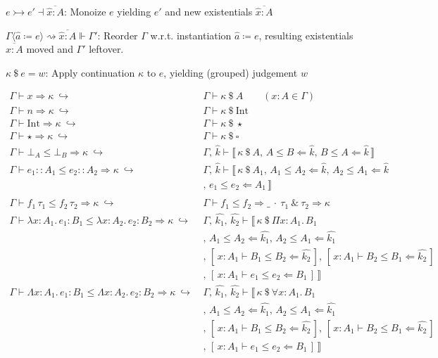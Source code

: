 \documentclass{article}
\newcommand{\inferapp}[4][\kappa]{#2 ~\cdot~#3~\&~#4 \Rightarrow #1}
\newcommand{\acheck}[3]{#1 \le #2 \Leftarrow #3}
\newcommand{\lcheck}[5][x]{[\,#1 : #2 \vdash \acheck{#3}{#4}{#5}\,]}
\newcommand{\ainfer}[3][\kappa]{#2 \le #3 \Rightarrow #1}
\newcommand{\sinfer}[2][\kappa]{#2 \Rightarrow #1}
\newcommand{\capp}[2][\kappa]{#1 ~\$~ #2}
\newcommand{\kvar}{\hat{k}}
\newcommand{\kvarn}[2][k]{\hat{#1_{#2}}}
\newcommand{\wlred}{~\hookrightarrow~ &}
\newcommand{\Int}{\mathrm{Int}}
\newcommand{\app}[2]{#1\,#2}
\newcommand{\alambda}[4][x]{\lambda #1 : #2.\, #3 : #4}
\newcommand{\abind}[4][x]{\Lambda #1 : #2.\, #3 : #4}
\newcommand{\aforall}[3][x]{\forall #1 : #2.\, #3}
\newcommand{\aPi}[3][x]{\Pi #1 : #2.\, #3}
\newcommand{\ngsep}{\\ & ,\,}
\newcommand{\wlgroup}[1]{\llbracket\, #1 \,\rrbracket}
\newcommand{\ex}[1][a]{\hat{#1}}
\newcommand{\exb}[2][a]{\hat{#1} : #2}
\newcommand{\monoize}[3]{#1 \rightarrowtail #2 \dashv \overline{#3}}
\newcommand{\reorder}[5]{#1\langle#2 \coloneqq #3 \rangle \rightsquigarrow \overline{#4} \Vdash #5}
\begin{document}
$\monoize{e}{e'}{\exb[x]{A}}$: Monoize $e$ yielding $e'$ and new existentials $\overline{\exb[x]{A}}$
\vspace{1em}

$\reorder{\Gamma}{\ex}{e}{\exb[x]{A}}{\Gamma'}$: Reorder $\Gamma$ w.r.t. instantiation $\ex \coloneqq e$,
resulting existentials $\overline{\exb[x]{A}}$ moved and $\Gamma'$ leftover.
\vspace{1em}

$\capp{e} = w$: Apply continuation $\kappa$ to $e$, yielding (grouped) judgement $w$

\begin{align*}
    \Gamma \vdash \sinfer{x} \wlred \Gamma \vdash \capp{A} \qquad (x : A \in \Gamma) \\
    \Gamma \vdash \sinfer{n} \wlred \Gamma \vdash \capp{\Int} \\
    \Gamma \vdash \sinfer{\Int} \wlred \Gamma \vdash \capp{\star} \\
    \Gamma \vdash \sinfer{\star} \wlred \Gamma \vdash \capp{\square} \\
    \Gamma \vdash \ainfer{\bot_{A}}{\bot_{B}} \wlred \Gamma,\, \kvar \vdash \llbracket\, \capp{A} ,\, \acheck{A}{B}{\kvar} ,\, \acheck{B}{A}{\kvar} \,\rrbracket \\
    \Gamma \vdash \ainfer{e_1 :: A_1}{e_2 :: A_2} \wlred
        \Gamma ,\, \kvar \vdash \wlgroup{\capp{A_1} ,\, \acheck{A_1}{A_2}{\kvar} ,\, \acheck{A_2}{A_1}{\kvar}
        \ngsep \acheck{e_1}{e_2}{A_1}} \\
    \\
    \Gamma \vdash \ainfer{\app{f_1}{\tau_1}}{\app{f_2}{\tau_2}} \wlred \Gamma \vdash \ainfer[\inferapp{\_}{\tau_1}{\tau_2}]{f_1}{f_2} \\
    \Gamma \vdash \ainfer{\alambda{A_1}{e_1}{B_1}}{\alambda{A_2}{e_2}{B_2}} \wlred
        \Gamma ,\, \kvarn{1} ,\, \kvarn{2} \vdash \wlgroup{\capp{\aPi{A_1}{B_1}}
        \ngsep \acheck{A_1}{A_2}{\kvarn{1}} ,\, \acheck{A_2}{A_1}{\kvarn{1}}
        \ngsep \lcheck{A_1}{B_1}{B_2}{\kvarn{2}} ,\, \lcheck{A_1}{B_2}{B_1}{\kvarn{2}}
        \ngsep \lcheck{A_1}{e_1}{e_2}{B_1}} \\
    \Gamma \vdash \ainfer{\abind{A_1}{e_1}{B_1}}{\abind{A_2}{e_2}{B_2}} \wlred
        \Gamma ,\, \kvarn{1} ,\, \kvarn{2} \vdash \wlgroup{\capp{\aforall{A_1}{B_1}}
        \ngsep \acheck{A_1}{A_2}{\kvarn{1}} ,\, \acheck{A_2}{A_1}{\kvarn{1}}
        \ngsep \lcheck{A_1}{B_1}{B_2}{\kvarn{2}} ,\, \lcheck{A_1}{B_2}{B_1}{\kvarn{2}}
        \ngsep \lcheck{A_1}{e_1}{e_2}{B_1}} \\

\end{align*}
\end{document}
